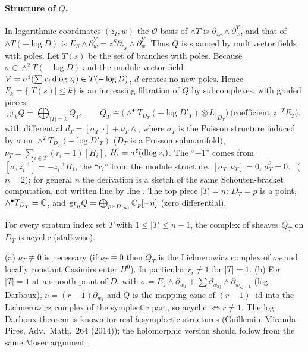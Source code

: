 \paragraph{Structure of $Q$.}
In logarithmic coordinates $(z_I,w)$ the $\mathcal O$-basis of $\wedge T$ is $\partial_{z_S}\wedge\partial_w^Y$, and that of $\wedge T(-\log D)$ is $E_S\wedge\partial_w^Y=z^S\partial_{z_S}\wedge\partial_w^Y$. Thus $Q$ is spanned by multivector fields with poles. Let $T(s)$ be the set of branches with poles. Because $\sigma\in\wedge^2T(-\log D)$ and the module vector field $V=\sigma^\sharp(\sum r_i\,\mathrm{dlog}\, z_i)\in T(-\log D)$, $d$ creates no new poles. Hence $F_k=\{|T(s)|\le k\}$ is an increasing filtration of $Q$ by subcomplexes, with graded pieces
\[\mathrm{gr}_kQ=\bigoplus_{|T|=k}Q_T,\qquad Q_T\cong\bigl(\wedge^\bullet T_{D_T}(-\log D'_T)\otimes L|_{D_T}\bigr)\ \text{(coefficient }z^{-T}E_T\text{)},\]
with differential $d_T=[\sigma_T,\cdot]+\nu_T\wedge$, where $\sigma_T$ is the Poisson structure induced by $\sigma$ on $\wedge^2T_{D_T}(-\log D'_T)$ ($D_T$ is a Poisson submanifold), $\nu_T=\sum_{i\in T}(r_i-1)[H_i]$, $H_i=\sigma^\sharp(\mathrm{dlog}\, z_i)$. The ``$-1$'' comes from $[\sigma,z_i^{-1}]=-z_i^{-1}H_i$, the ``$r_i$'' from the module structure. $[\sigma_T,\nu_T]=0$, $d_T^2=0$. \tP\ ($n=2$); for general $n$ the derivation is a sketch of the same Schouten-bracket computation, not written line by line \tQ.
The top piece $|T|=n$: $D_T=p$ is a point, $\wedge^\bullet T_{D_T}=\mathbb C$, and $\mathrm{gr}_nQ=\bigoplus_{p\in D_{(n)}}\mathbb C_p[-n]$ (zero differential). \tP

\begin{defn}[(GEN$'$)]\label{def:GEN}
For every stratum index set $T$ with $1\le|T|\le n-1$, the complex of sheaves $Q_T$ on $D_T$ is acyclic (stalkwise).
\end{defn}
\begin{prop}\tP\label{prop:genNec}
(a) $\nu_T\not\equiv0$ is necessary (if $\nu_T\equiv0$ then $Q_T$ is the Lichnerowicz complex of $\sigma_T$ and locally constant Casimirs enter $H^0$). In particular $r_i\neq1$ for $|T|=1$.
(b) For $|T|=1$ at a smooth point of $D$: with $\sigma=E_z\wedge\partial_{w_1}+\sum\partial_{w_{2j}}\wedge\partial_{w_{2j+1}}$ (log Darboux), $\nu=(r-1)\partial_{w_1}$ and $Q$ is the mapping cone of $(r-1)\cdot\mathrm{id}$ into the Lichnerowicz complex of the symplectic part, so acyclic $\iff r\neq1$. The log Darboux theorem is known for real $b$-symplectic structures (Guillemin--Miranda--Pires, Adv.\ Math.\ 264 (2014)); the holomorphic version should follow from the same Moser argument \tQ.
\end{prop}

